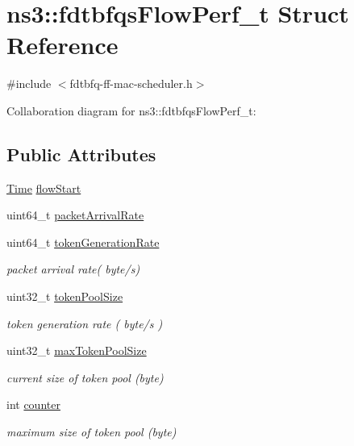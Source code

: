 \hypertarget{structns3_1_1fdtbfqsFlowPerf__t}{}\section{ns3\+:\+:fdtbfqs\+Flow\+Perf\+\_\+t Struct Reference}
\label{structns3_1_1fdtbfqsFlowPerf__t}


{\ttfamily \#include $<$fdtbfq-\/ff-\/mac-\/scheduler.\+h$>$}



Collaboration diagram for ns3\+:\+:fdtbfqs\+Flow\+Perf\+\_\+t\+:
\subsection*{Public Attributes}
\begin{DoxyCompactItemize}
\item 
\hyperlink{classns3_1_1Time}{Time} \hyperlink{structns3_1_1fdtbfqsFlowPerf__t_a001d932bc9da4b0d4fb458411334eef3}{flow\+Start}
\item 
uint64\+\_\+t \hyperlink{structns3_1_1fdtbfqsFlowPerf__t_aa6fd077fde3105081d62e6c46741a1c5}{packet\+Arrival\+Rate}
\item 
uint64\+\_\+t \hyperlink{structns3_1_1fdtbfqsFlowPerf__t_ada77287bdf68b8d1919a896cd4892822}{token\+Generation\+Rate}
\begin{DoxyCompactList}\small\item\em packet arrival rate( byte/s) \end{DoxyCompactList}\item 
uint32\+\_\+t \hyperlink{structns3_1_1fdtbfqsFlowPerf__t_ac30c1a2a07383c9609ca96133b863a55}{token\+Pool\+Size}
\begin{DoxyCompactList}\small\item\em token generation rate ( byte/s ) \end{DoxyCompactList}\item 
uint32\+\_\+t \hyperlink{structns3_1_1fdtbfqsFlowPerf__t_acf8230e7891aff039887ee3b4b31cc5a}{max\+Token\+Pool\+Size}
\begin{DoxyCompactList}\small\item\em current size of token pool (byte) \end{DoxyCompactList}\item 
int \hyperlink{structns3_1_1fdtbfqsFlowPerf__t_a18996f58f524a200d21ed6bab8d1bdf8}{counter}
\begin{DoxyCompactList}\small\item\em maximum size of token pool (byte) \end{DoxyCompactList}\item 

\end{DoxyCompactItemize}

